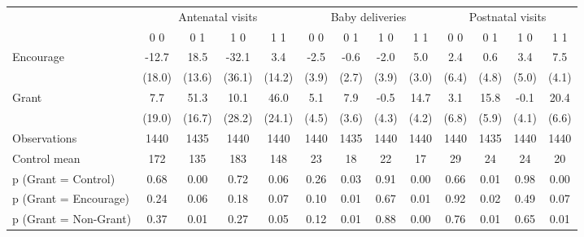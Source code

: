 \begin{tabular*}{\hsize}{@{\hskip\tabcolsep\extracolsep\fill}l*{12}{c}}
\toprule
                    &\multicolumn{4}{c}{Antenatal visits}               &\multicolumn{4}{c}{Baby deliveries}                &\multicolumn{4}{c}{Postnatal visits}               \\\cmidrule(lr){2-5}\cmidrule(lr){6-9}\cmidrule(lr){10-13}
                    &\multicolumn{1}{c}{0 0}&\multicolumn{1}{c}{0 1}&\multicolumn{1}{c}{1 0}&\multicolumn{1}{c}{1 1}&\multicolumn{1}{c}{0 0}&\multicolumn{1}{c}{0 1}&\multicolumn{1}{c}{1 0}&\multicolumn{1}{c}{1 1}&\multicolumn{1}{c}{0 0}&\multicolumn{1}{c}{0 1}&\multicolumn{1}{c}{1 0}&\multicolumn{1}{c}{1 1}\\
\midrule
Encourage           &       -12.7&        18.5&       -32.1&         3.4&        -2.5&        -0.6&        -2.0&         5.0&         2.4&         0.6&         3.4&         7.5\\
                    &      (18.0)&      (13.6)&      (36.1)&      (14.2)&       (3.9)&       (2.7)&       (3.9)&       (3.0)&       (6.4)&       (4.8)&       (5.0)&       (4.1)\\
\addlinespace
Grant               &         7.7&        51.3&        10.1&        46.0&         5.1&         7.9&        -0.5&        14.7&         3.1&        15.8&        -0.1&        20.4\\
                    &      (19.0)&      (16.7)&      (28.2)&      (24.1)&       (4.5)&       (3.6)&       (4.3)&       (4.2)&       (6.8)&       (5.9)&       (4.1)&       (6.6)\\
\midrule
Observations        &        1440&        1435&        1440&        1440&        1440&        1435&        1440&        1440&        1440&        1435&        1440&        1440\\
Control mean        &         172&         135&         183&         148&          23&          18&          22&          17&          29&          24&          24&          20\\
p (Grant = Control) &        0.68&        0.00&        0.72&        0.06&        0.26&        0.03&        0.91&        0.00&        0.66&        0.01&        0.98&        0.00\\
p (Grant = Encourage)&        0.24&        0.06&        0.18&        0.07&        0.10&        0.01&        0.67&        0.01&        0.92&        0.02&        0.49&        0.07\\
p (Grant = Non-Grant)&        0.37&        0.01&        0.27&        0.05&        0.12&        0.01&        0.88&        0.00&        0.76&        0.01&        0.65&        0.01\\
\bottomrule
\end{tabular*}
